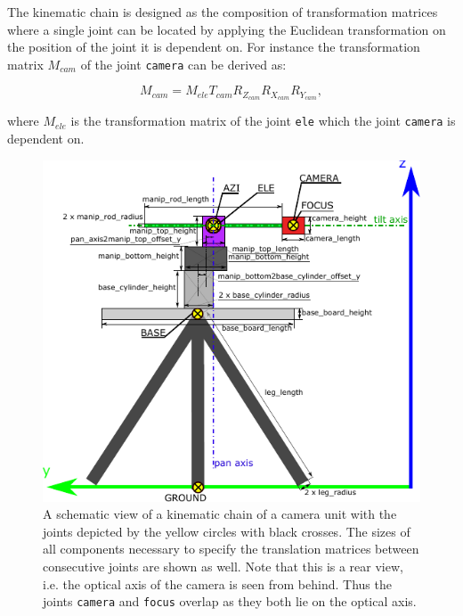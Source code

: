 The kinematic chain is designed as the composition of transformation matrices where a single joint can be located by applying the Euclidean transformation on the position of the joint it is dependent on. For instance the transformation matrix $M_{cam}$ of the joint \texttt{camera} can be derived as:

\begin{equation}
M_{cam} = M_{ele}T_{cam}R_{Z_{cam}}R_{X_{cam}}R_{Y_{cam}},
\end{equation}

where $M_{ele}$ is the transformation matrix of the joint \texttt{ele} which the joint \texttt{camera} is dependent on. 

\begin{figure}[htb]
	\centering
	\includegraphics[width=14cm]{fig/camera_unit_kinematic_chain.pdf}
	\caption{A schematic view of a kinematic chain of a camera unit with the joints depicted by the yellow circles with black crosses. The sizes of all components necessary to specify the translation matrices between consecutive joints are shown as well. Note that this is a rear view, i.e. the optical axis of the camera is seen from behind. Thus the joints \texttt{camera} and \texttt{focus} overlap as they both lie on the optical axis.}
	\label{fig:camera_unit_kinematic_chain}
\end{figure}



